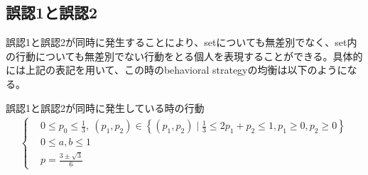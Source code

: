 \documentclass{jsarticle}
\begin{document}
\subsection{誤認1と誤認2}
誤認1と誤認2が同時に発生することにより、setについても無差別でなく、set内の行動についても無差別でない行動をとる個人を表現することができる。具体的には上記の表記を用いて、この時のbehavioral strategyの均衡は以下のようになる。
\begin{itembox}[l]{誤認1と誤認2が同時に発生している時の行動}
\begin{align}
	\begin{cases}
    	&0 \leq p_0 \leq \frac{1}{3}, \ (p_1, p_2) \in \left\{ (p_1, p_2) \mid \frac{1}{3} \leq 2p_1 + p_2 \leq 1, p_1 \geq 0, p_2 \geq 0\right\}\\[10pt]
	&0 \leq a, b \leq 1\\[10pt]
	&p = \frac{3\pm \sqrt{3}}{6}
	\end{cases}
\end{align}
\end{itembox}
\end{document}
